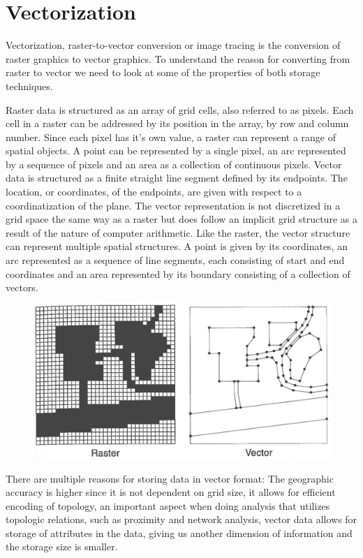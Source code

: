 \chapter{Vectorization}\label{chp:vectorization}
Vectorization, raster-to-vector conversion or image tracing is the conversion of raster graphics to vector graphics. To understand the reason for converting from raster to vector we need to look at some of the properties of both storage techniques.

Raster data is structured as an array of grid cells, also referred to as pixels. Each cell in a raster can be addressed by its position in the array, by row and column number. Since each pixel has it's own value, a raster can represent a range of spatial objects. A point can be represented by a single pixel, an arc represented by a sequence of pixels and an area as a collection of continuous pixels. Vector data is structured as a finite straight line segment defined by its endpoints. The location, or coordinates, of the endpoints, are given with respect to a coordinatization of the plane. The vector representation is not discretized in a grid space the same way as a raster but does follow an implicit grid structure as a result of the nature of computer arithmetic. Like the raster, the vector structure can represent multiple spatial structures. A point is given by its coordinates, an arc represented as a sequence of line segments, each consisting of start and end coordinates and an area represented by its boundary consisting of a collection of vectors.

\begin{figure}[H]
	\centering
	\includegraphics[width=0.8\linewidth]{fig/rastervector.png}
	\label{fig:rastervsvector}
\end{figure}

There are multiple reasons for storing data in vector format: The geographic accuracy is higher since it is not dependent on grid size, it allows for efficient encoding of topology, an important aspect when doing analysis that utilizes topologic relations, such as proximity and network analysis, vector data allows for storage of attributes in the data, giving us another dimension of information and the storage size is smaller.

